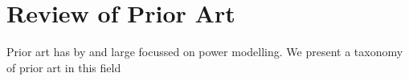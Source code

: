 \section{Review of Prior Art}
\label{sec:prior}

Prior art has by and large focussed on power modelling.
We present a taxonomy of prior art in this field


